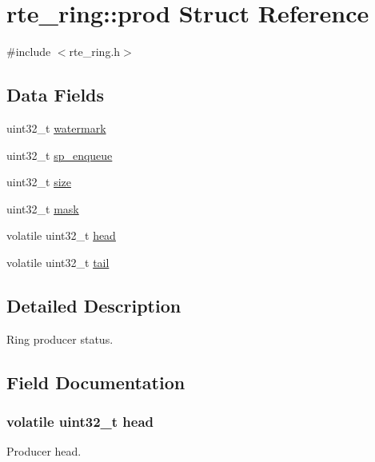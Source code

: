 \hypertarget{structrte__ring_1_1prod}{}\section{rte\+\_\+ring\+:\+:prod Struct Reference}
\label{structrte__ring_1_1prod}


{\ttfamily \#include $<$rte\+\_\+ring.\+h$>$}

\subsection*{Data Fields}
\begin{DoxyCompactItemize}
\item 
uint32\+\_\+t \hyperlink{structrte__ring_1_1prod_aa45ec262d621c95d7c893c9862774cb7}{watermark}
\item 
uint32\+\_\+t \hyperlink{structrte__ring_1_1prod_a9215b840f399e8cab705caa55ed47222}{sp\+\_\+enqueue}
\item 
uint32\+\_\+t \hyperlink{structrte__ring_1_1prod_ab2c6b258f02add8fdf4cfc7c371dd772}{size}
\item 
uint32\+\_\+t \hyperlink{structrte__ring_1_1prod_ad3bee21df6875eeccd25d3c577e0600a}{mask}
\item 
volatile uint32\+\_\+t \hyperlink{structrte__ring_1_1prod_a5f4413ef4a8b1d82ffcfce4265fde558}{head}
\item 
volatile uint32\+\_\+t \hyperlink{structrte__ring_1_1prod_ac053cdb6967e8901ed4c87327d649bf7}{tail}
\end{DoxyCompactItemize}


\subsection{Detailed Description}
Ring producer status. 

\subsection{Field Documentation}
\hypertarget{structrte__ring_1_1prod_a5f4413ef4a8b1d82ffcfce4265fde558}{}
\subsubsection[{head}]{\setlength{\rightskip}{0pt plus 5cm}volatile uint32\+\_\+t head}\label{structrte__ring_1_1prod_a5f4413ef4a8b1d82ffcfce4265fde558}
Producer head. \hypertarget{structrte__ring_1_1prod_ad3bee21df6875eeccd25d3c577e0600a}{}
